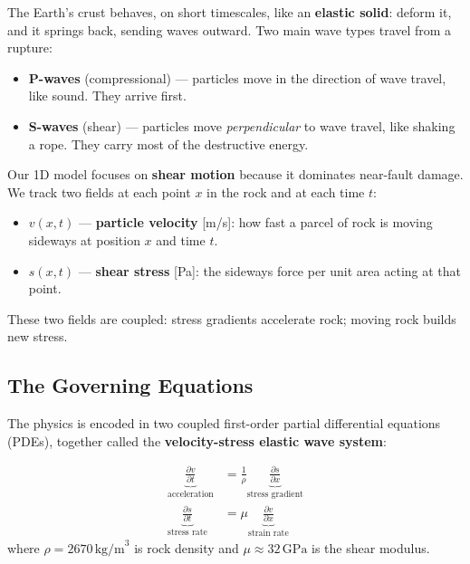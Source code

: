 \documentclass[12pt, a4paper]{article}
\theoremstyle{definition}
\begin{document}
The Earth's crust behaves, on short timescales, like an \textbf{elastic solid}:
deform it, and it springs back, sending waves outward.  Two main wave types
travel from a rupture:

\begin{itemize}
  \item \textbf{P-waves} (compressional) — particles move in the direction of
    wave travel, like sound.  They arrive first.
  \item \textbf{S-waves} (shear) — particles move \textit{perpendicular} to
    wave travel, like shaking a rope.  They carry most of the destructive energy.
\end{itemize}

Our 1D model focuses on \textbf{shear motion} because it dominates near-fault
damage.  We track two fields at each point $x$ in the rock and at each time $t$:

\begin{tcolorbox}[highlight=myblue, title=The Two Primary Fields]
  \begin{itemize}
    \item $v(x,t)$ — \textbf{particle velocity} [m/s]: how fast a parcel of rock
      is moving sideways at position $x$ and time $t$.
    \item $s(x,t)$ — \textbf{shear stress} [Pa]: the sideways force per unit area
      acting at that point.
  \end{itemize}
  These two fields are coupled: stress gradients accelerate rock; moving rock
  builds new stress.
\end{tcolorbox}

\subsection{The Governing Equations}

The physics is encoded in two coupled first-order partial differential equations
(PDEs), together called the \textbf{velocity-stress elastic wave system}:

\begin{tcolorbox}[highlight=mygold, title=Governing PDEs]
  \begin{align}
    \underbrace{\frac{\partial v}{\partial t}}_{\text{acceleration}}
    &= \frac{1}{\rho}\underbrace{\frac{\partial s}{\partial x}}_{\text{stress gradient}}
    \tag{Momentum -- Newton's 2nd Law} \label{eq:momentum}\\[8pt]
    \underbrace{\frac{\partial s}{\partial t}}_{\text{stress rate}}
    &= \mu\underbrace{\frac{\partial v}{\partial x}}_{\text{strain rate}}
    \tag{Constitutive -- Hooke's Law} \label{eq:constitutive}
  \end{align}
  where $\rho = 2670\,\text{kg/m}^3$ is rock density and
  $\mu \approx 32\,\text{GPa}$ is the shear modulus.
\end{tcolorbox}
\end{document}
